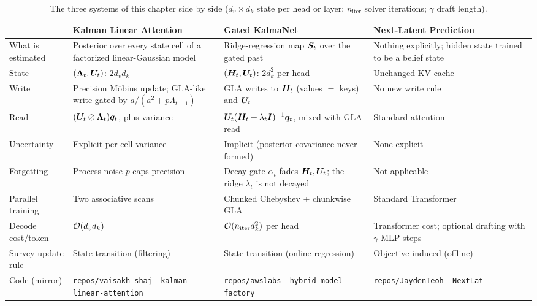 \begin{table}[t]
\centering
\small
\caption{The three systems of this chapter side by side ($d_v\times d_k$ state per head or layer;
$n_\text{iter}$ solver iterations; $\gamma$ draft length).}
\label{tab:c08-compare}
\begin{tabularx}{\textwidth}{@{}>{\raggedright\arraybackslash}p{2.3cm}>{\raggedright\arraybackslash}X>{\raggedright\arraybackslash}X>{\raggedright\arraybackslash}X@{}}
\toprule
 & \textbf{Kalman Linear Attention} & \textbf{Gated KalmaNet} & \textbf{Next-Latent Prediction} \\
\midrule
What is estimated & Posterior over every state cell of a factorized linear-Gaussian model & Ridge-regression map $\bm{S}_t$ over the gated past & Nothing explicitly; hidden state trained to be a belief state \\
State & $(\bm{\Lambda}_t,\bm{U}_t)$: $2d_vd_k$ & $(\bm{H}_t,\bm{U}_t)$: $2d_k^2$ per head & Unchanged KV cache \\
Write & Precision M\"obius update; GLA-like write gated by $a/(a^2+p\Lambda_{t-1})$ & GLA writes to $\bm{H}_t$ (values $=$ keys) and $\bm{U}_t$ & No new write rule \\
Read & $(\bm{U}_t\oslash\bm{\Lambda}_t)\bm{q}_t$, plus variance & $\bm{U}_t(\bm{H}_t+\lambda_t\bm{I})^{-1}\bm{q}_t$, mixed with GLA read & Standard attention \\
Uncertainty & Explicit per-cell variance & Implicit (posterior covariance never formed) & None explicit \\
Forgetting & Process noise $p$ caps precision & Decay gate $\alpha_t$ fades $\bm{H}_t,\bm{U}_t$; the ridge $\lambda_t$ is not decayed & Not applicable \\
Parallel training & Two associative scans & Chunked Chebyshev + chunkwise GLA & Standard Transformer \\
Decode cost/token & $\mathcal{O}(d_vd_k)$ & $\mathcal{O}(n_\text{iter}d_k^2)$ per head & Transformer cost; optional drafting with $\gamma$ MLP steps \\
Survey update rule & State transition (filtering) & State transition (online regression) & Objective-induced (offline) \\
Code (mirror) & \texttt{repos/\allowbreak vaisakh-shaj\_\_kalman-\allowbreak linear-attention} & \texttt{repos/\allowbreak awslabs\_\_hybrid-\allowbreak model-factory} & \texttt{repos/\allowbreak JaydenTeoh\_\_NextLat} \\
\bottomrule
\end{tabularx}
\end{table}

